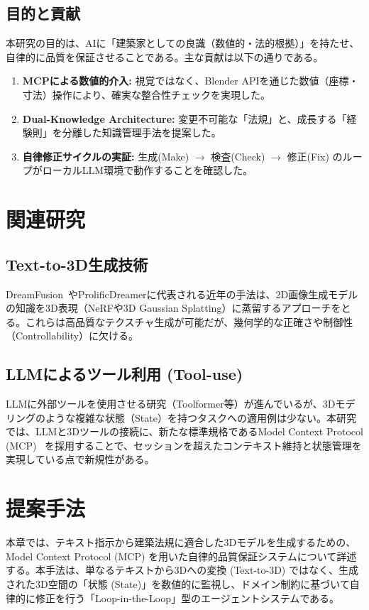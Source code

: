 \documentclass{deimj}
\begin{document}
\subsection{目的と貢献}
本研究の目的は、AIに「建築家としての良識（数値的・法的根拠）」を持たせ、自律的に品質を保証させることである。主な貢献は以下の通りである。
\begin{enumerate}
  \item \textbf{MCPによる数値的介入:} 視覚ではなく、Blender APIを通じた数値（座標・寸法）操作により、確実な整合性チェックを実現した。
  \item \textbf{Dual-Knowledge Architecture:} 変更不可能な「法規」と、成長する「経験則」を分離した知識管理手法を提案した。
  \item \textbf{自律修正サイクルの実証:} 生成(Make) $\to$ 検査(Check) $\to$ 修正(Fix) のループがローカルLLM環境で動作することを確認した。
\end{enumerate}

\section{関連研究}

\subsection{Text-to-3D生成技術}
DreamFusion~\cite{DreamFusion}やProlificDreamerに代表される近年の手法は、2D画像生成モデルの知識を3D表現（NeRFや3D Gaussian Splatting）に蒸留するアプローチをとる。これらは高品質なテクスチャ生成が可能だが、幾何学的な正確さや制御性（Controllability）に欠ける。

\subsection{LLMによるツール利用 (Tool-use)}
LLMに外部ツールを使用させる研究（Toolformer等）が進んでいるが、3Dモデリングのような複雑な状態（State）を持つタスクへの適用例は少ない。本研究では、LLMと3Dツールの接続に、新たな標準規格であるModel Context Protocol (MCP)~\cite{MCP} を採用することで、セッションを超えたコンテキスト維持と状態管理を実現している点で新規性がある。

\section{提案手法}

本章では、テキスト指示から建築法規に適合した3Dモデルを生成するための、Model Context Protocol (MCP) を用いた自律的品質保証システムについて詳述する。本手法は、単なるテキストから3Dへの変換 (Text-to-3D) ではなく、生成された3D空間の「状態 (State)」を数値的に監視し、ドメイン制約に基づいて自律的に修正を行う「Loop-in-the-Loop」型のエージェントシステムである。
\end{document}
